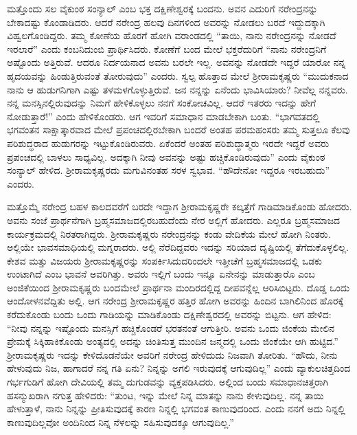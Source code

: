 ಮತ್ತೊಂದು ಸಲ ವೈಕುಂಠ ಸಂನ್ಯಾಲ್ ಎಂಬ ಭಕ್ತ ದಕ್ಷಿಣೇಶ್ವರಕ್ಕೆ ಬಂದನು. ಅವನ ಎದುರಿಗೆ ನರೇಂದ್ರನನ್ನು ಬೇಕಾದಷ್ಟು ಕೊಂಡಾಡಿದರು. ಆದರೆ ನರೇಂದ್ರ ಹಲವು ದಿನಗಳಿಂದ ಅವರನ್ನು ನೋಡಲು ಬರದೆ ಇದ್ದುದಕ್ಕಾಗಿ ವಿಹ್ವಲಗೊಂಡಿದ್ದರು. ತಮ್ಮ ಕೋಣೆಯ ಹೊರಗೆ ಹೋಗಿ ವರಾಂಡದಲ್ಲಿ “ತಾಯಿ, ನಾನು ನರೇಂದ್ರನನ್ನು ನೋಡದೆ ಇರಲಾರೆ” ಎಂದು ಕಂಬನಿದುಂಬಿ ಪ್ರಾರ್ಥಿಸಿದರು. ಕೋಣೆಗೆ ಬಂದ ಮೇಲೆ ಭಕ್ತರೆದುರಿಗೆ “ನಾನು ನರೇಂದ್ರನಿಗೆ ಅಷ್ಟೊಂದು ಅತ್ತಿರುವೆ. ಆದರೂ ನಿರ್ದಯನಾದ ಅವನು ಬರಲೇ ಇಲ್ಲ. ಅವನನ್ನು ನೋಡದೇ ಇದ್ದರೆ ಯಾರೋ ನನ್ನ ಹೃದಯವನ್ನು ಹಿಂಡುತ್ತಿರುವಂತೆ ತೋರುವುದು” ಎಂದರು. ಸ್ವಲ್ಪ ಹೊತ್ತಾದ ಮೇಲೆ ಶ‍್ರೀರಾಮಕೃಷ್ಣರು “ಮುದುಕನಾದ ನಾನು ಆ ಹುಡುಗನಿಗಾಗಿ ಎಷ್ಟು ತಳಮಳಗೊಳ್ಳುತ್ತಿರುವೆ. ಜನ ನನ್ನನ್ನು ಏನೆಂದು ಭಾವಿಸಿಯಾರು? ನೀವೆಲ್ಲ ನನ್ನವರು. ನನ್ನ ಮನಸ್ಸಿನಲ್ಲಿರುವುದನ್ನು ನಿಮಗೆ ಹೇಳಿಕೊಳ್ಳಲು ನನಗೆ ಸಂಕೋಚವಿಲ್ಲ. ಆದರೆ ಇತರರು ಇದನ್ನು ಹೇಗೆ ನೋಡುತ್ತಾರೆ!” ಎಂದು ಹೇಳಿಕೊಂಡರು. ಆಗ ಇವರಿಗೆ ಸಮಾಧಾನ ಮಾಡಬೇಕಾಗಿ ಬಂತು. “ಭಾಗವತದಲ್ಲಿ ಭಗವಂತನ ಸಾಕ್ಷಾತ್ಕಾರವಾದ ಮೇಲೆ ಪ್ರಪಂಚದಲ್ಲಿರಬೇಕಾಗಿ ಬಂದರೆ ಅಂತಹ ಪರಮಹಂಸರು ತಮ್ಮ ಸುತ್ತಲೂ ಕೆಲವು ಪರಿಶುದ್ಧರಾದ ಹುಡುಗರನ್ನು ಇಟ್ಟುಕೊಂಡಿರುವರು. ಏಕೆಂದರೆ ಅಂತಹ ಪರಿಶುದ್ಧಾತ್ಮರು ಇರದೇ ಇದ್ದರೆ ಅವರು ಪ್ರಪಂಚದಲ್ಲಿ ಬಾಳಲು ಸಾಧ್ಯವಿಲ್ಲ. ಅದಕ್ಕಾಗಿ ನೀವು ಅವನನ್ನು ಅಷ್ಟು ಹಚ್ಚಿಕೊಂಡಿರುವುದು” ಎಂದು ವೈಕುಂಠ ಸಂನ್ಯಾಲ್ ಹೇಳಿದ. ಶ‍್ರೀರಾಮಕೃಷ್ಣರದು ಮಗುವಿನಂತಹ ಸರಳ ಸ್ವಭಾವ. “ಹೌದೇನೋ ಇದ್ದರೂ ಇರಬಹುದು” ಎಂದರು.

\newpage

ಮತ್ತೊಮ್ಮೆ ನರೇಂದ್ರ ಬಹಳ ಕಾಲದವರೆಗೆ ಬರದೇ ಇದ್ದಾಗ ಶ‍್ರೀರಾಮಕೃಷ್ಣರೇ ಕಲ್ಕತ್ತೆಗೆ ಗಾಡಿಮಾಡಿಕೊಂಡು ಹೋದರು. ಅವನು ಸಂಜೆ ಪ್ರಾರ್ಥನೆಗಾಗಿ ಬ್ರಹ್ಮಸಮಾಜದಲ್ಲಿರಬಹುದೆಂದು ನೇರ ಅಲ್ಲಿಗೆ ಹೋದರು. ಎಲ್ಲರೂ ಬ್ರಹ್ಮಸಮಾಜದ ಕಾರ್ಯಕ್ರಮದಲ್ಲಿ ನಿರತರಾಗಿದ್ದರು. ಶ‍್ರೀರಾಮಕೃಷ್ಣರು ನರೇಂದ್ರನನ್ನು ಕಂಡು ವೇದಿಕೆಯ ಮೇಲೆ ಹೋಗಿ ನಿಂತರು. ಅಲ್ಲಿಯೇ ಭಾವಸಮಾಧಿಯಲ್ಲಿ ಮಗ್ನರಾದರು. ಅಲ್ಲಿ ನೆರೆದಿದ್ದವರು ಇದನ್ನು ಸರಿಯಾದ ದೃಷ್ಟಿಯಲ್ಲಿ ತೆಗೆದುಕೊಳ್ಳಲಿಲ್ಲ. ಕೇಶವ ಮತ್ತು ವಿಜಯರು ಶ‍್ರೀರಾಮಕೃಷ್ಣರನ್ನು ಸಂಪರ್ಕಿಸಿದುದರಿಂದಲೇ ಇತ್ತೀಚೆಗೆ ಬ್ರಹ್ಮಸಮಾಜದಲ್ಲಿ ಒಡಕು ಉಂಟಾಗಿದೆ ಎಂಬ ಭಾವನೆ ಅವರಿಗಿತ್ತು. ಅವರು ಇಲ್ಲಿಗೆ ಬಂದು ಇನ್ನೂ ಏನೇನನ್ನು ಮಾಡುತ್ತಾರೊ ಎಂಬ ಅಂಜಿಕೆಯಿಂದ ಶ‍್ರೀರಾಮಕೃಷ್ಣರು ಬಂದಮೇಲೆ ಪ್ರಾರ್ಥನಾ ಮಂದಿರದಲ್ಲಿದ್ದ ದೀಪವನ್ನೆಲ್ಲ ಆರಿಸಿಬಿಟ್ಟರು. ದೊಡ್ಡ ಒಂದು ಆಂದೋಳನವೆದ್ದಿತು ಅಲ್ಲಿ. ಆಗ ನರೇಂದ್ರ ಶ‍್ರೀರಾಮಕೃಷ್ಣರ ಹತ್ತಿರ ಹೋಗಿ ಅವರನ್ನು ಹಿಂದಿನ ಬಾಗಿಲಿನಿಂದ ಹೊರಕ್ಕೆ ಕರೆದುಕೊಂಡು ಬಂದು ಒಂದು ಗಾಡಿಯನ್ನು ಮಾಡಿಕೊಂಡು ದಕ್ಷಿಣೇಶ್ವರದಲ್ಲಿ ಅವರನ್ನು ಬಿಟ್ಟನು. ಆಗ ಹೇಳಿದ: “ನೀವು ನನ್ನನ್ನು ಇಷ್ಟೊಂದು ಮನಸ್ಸಿಗೆ ಹಚ್ಚಿಕೊಂಡರೆ ಭರತನಂತೆ ಆಗುತ್ತೀರಿ. ಅವನು ಒಂದು ಜಿಂಕೆಯ ಮೇಲಿನ ಪ್ರೇಮಕ್ಕೆ ಸಿಕ್ಕಿಹಾಕಿಕೊಂಡು ಅಂತ್ಯದಲ್ಲಿ ಅದನ್ನು ಚಿಂತಿಸುತ್ತ ಮುಂದಿನ ಜನ್ಮದಲ್ಲಿ ಒಂದು ಜಿಂಕೆಯೇ ಆಗಿ ಹುಟ್ಟಿದ.” ಶ‍್ರೀರಾಮಕೃಷ್ಣರು ಇದನ್ನು ಕೇಳಿದೊಡನೆಯೇ ಅವರಿಗೆ ನರೇಂದ್ರ ಹೇಳಿದುದು ನಿಜವಾಗಿ ತೋರಿತು. “ಹೌದು, ನೀನು ಹೇಳುವುದು ನಿಜ, ಹಾಗಾದರೆ ನನ್ನ ಗತಿ ಏನು? ನಿನ್ನನ್ನು ಅಗಲಿ ಇರುವುದಕ್ಕೆ ಆಗುವುದಿಲ್ಲ” ಎಂದು ವ್ಯಾಕುಲಚಿತ್ತದಿಂದ ಗರ್ಭಗುಡಿಗೆ ಹೋಗಿ ದೇವಿಯಲ್ಲಿ ತಮ್ಮ ದುಗುಡವನ್ನು ವ್ಯಕ್ತಪಡಿಸಿದರು. ಅಲ್ಲಿಂದ ಬಂದು ಸಮಾಧಾನಚಿತ್ತರಾಗಿ ಹಸನ್ಮುಖರಾಗಿ ನಗುತ್ತ ಹೇಳಿದರು: “ತುಂಟ, ಇನ್ನು ಮೇಲೆ ನಿನ್ನ ಮಾತನ್ನು ನಾನು ಕೇಳುವುದಿಲ್ಲ. ನನ್ನ ತಾಯಿ ಹೇಳುತ್ತಾಳೆ, ನಾನು ನಿನ್ನನ್ನು ಪ್ರೀತಿಸುವುದಕ್ಕೆ ಕಾರಣ ನಿನ್ನಲ್ಲಿ ಭಗವಂತ ಕಾಣುವುದರಿಂದ. ಎಂದು ನನಗೆ ಅದು ನಿನ್ನಲ್ಲಿ ಕಾಣುವುದಿಲ್ಲವೋ ಅಂದಿನಿಂದ ನಿನ್ನ ನೆಳಲನ್ನು ಸಹಿಸುವುದಕ್ಕೂ ಆಗುವುದಿಲ್ಲ.”

